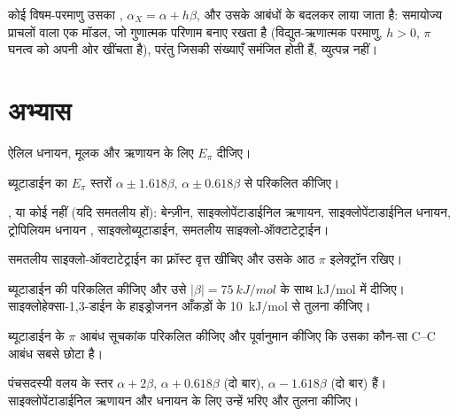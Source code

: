 कोई विषम-परमाणु उसका , $\alpha_X = \alpha + h\beta$, और उसके आबंधों के
 बदलकर लाया जाता है: समायोज्य प्राचलों वाला एक मॉडल, जो
गुणात्मक परिणाम बनाए रखता है (विद्युत-ऋणात्मक परमाणु, $h > 0$, $\pi$ घनत्व को अपनी ओर
खींचता है), परंतु जिसकी संख्याएँ समंजित होती हैं, व्युत्पन्न नहीं।

\section{अभ्यास}

\begin{exercise}[$\star$]\label{exo:b2:huckel:1}
ऐलिल धनायन, मूलक और ऋणायन के लिए $E_\pi$ दीजिए।
\end{exercise}

\begin{exercise}[$\star$]\label{exo:b2:huckel:2}
ब्यूटाडाईन का $E_\pi$ स्तरों $\alpha \pm 1.618\beta$, $\alpha \pm 0.618\beta$ से परिकलित कीजिए।
\end{exercise}

\begin{exercise}[$\star$]\label{exo:b2:huckel:3}
,  या कोई नहीं (यदि समतलीय हों): बेन्ज़ीन, साइक्लोपेंटाडाईनिल ऋणायन,
साइक्लोपेंटाडाईनिल धनायन, ट्रोपिलियम धनायन , साइक्लोब्यूटाडाईन, समतलीय
साइक्लो-ऑक्टाटेट्राईन।
\end{exercise}

\begin{exercise}[$\star$]\label{exo:b2:huckel:4}
समतलीय साइक्लो-ऑक्टाटेट्राईन का फ़्रॉस्ट वृत्त खींचिए और उसके आठ $\pi$ इलेक्ट्रॉन रखिए।
\end{exercise}

\begin{exercise}[$\star\star$]\label{exo:b2:huckel:5}
ब्यूटाडाईन की  परिकलित कीजिए और उसे
$|\beta| = \qty{75}{kJ/mol}$ के साथ \unit{kJ/mol} में दीजिए। साइक्लोहेक्सा-1,3-डाईन के हाइड्रोजनन
आँकड़ों के \qty{10}{kJ/mol} से तुलना कीजिए।
\end{exercise}

\begin{exercise}[$\star\star$]\label{exo:b2:huckel:6}
ब्यूटाडाईन के $\pi$ आबंध सूचकांक परिकलित कीजिए और पूर्वानुमान कीजिए कि उसका कौन-सा C--C आबंध
सबसे छोटा है।
\end{exercise}

\begin{exercise}[$\star\star$]\label{exo:b2:huckel:7}
पंचसदस्यी वलय के स्तर $\alpha + 2\beta$, $\alpha + 0.618\beta$ (दो बार),
$\alpha - 1.618\beta$ (दो बार) हैं। साइक्लोपेंटाडाईनिल ऋणायन और धनायन के लिए उन्हें भरिए और
तुलना कीजिए।
\end{exercise}

